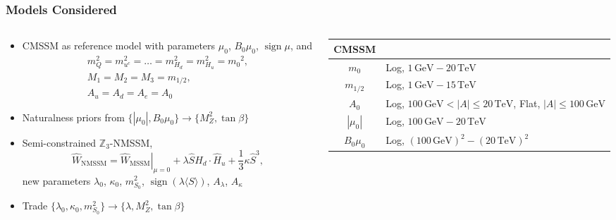 \documentclass[10pt,aspectratio=169]{beamer}
\DeclareMathOperator{\sign}{sign}
\newcommand{\mzero}{\ensuremath{m_0}\xspace}
\newcommand{\mhalf}{\ensuremath{m_{1/2}}\xspace}
\newcommand{\azero}{\ensuremath{A_0}\xspace}
\newcommand{\sgnmu}{\ensuremath{\sign \mu}\xspace}
\newcommand{\gev}{\ensuremath{\,\text{GeV}}\xspace}
\newcommand{\tev}{\ensuremath{\,\text{TeV}}\xspace}
\begin{document}
\begin{frame}
  \frametitle{Models Considered}
  \begin{columns}[t]
    \begin{column}{0.55\textwidth}
      \vspace{-10pt}
      \begin{itemize} \itemsep1em
      \item CMSSM as reference model with parameters
        $\mu_0$, $B_0 \mu_0$, $\sgnmu$, and
        \begin{gather*}
          m_Q^2 = m_{u^c}^2 = \ldots = m_{H_d}^2 = m_{H_u}^2 = \mzero^2 , \\
          M_1 = M_2 = M_3 = \mhalf , \\
          A_u = A_d = A_e = \azero
        \end{gather*}
      \item Naturalness priors from $\{ |\mu_0 |, B_0 \mu_0 \}
        \to \{ M_Z^2, \tan\beta \}$
      \item Semi-constrained $\mathbb{Z}_3$-NMSSM,
        \begin{equation*}
          \widehat{W}_{\text{NMSSM}} = \left . \widehat{W}_{\text{MSSM}}
          \right |_{\mu = 0} + \lambda \hat{S} \hat{H}_d \cdot \hat{H}_u
          + \frac{1}{3} \kappa \hat{S}^3 ,
        \end{equation*}
        new parameters $\lambda_0$, $\kappa_0$, $m_{S_0}^2$,
        $\sign (\lambda \langle S \rangle)$,
        $A_\lambda$, $A_\kappa$
      \item Trade $\{ \lambda_0, \kappa_0, m_{S_0}^2 \}
        \to \{ \lambda, M_Z^2, \tan\beta \}$
      \end{itemize}
    \end{column}
    \begin{column}{0.5\textwidth}
      \begin{table}
        \centering
        \begin{tabularx}{0.8\textwidth}{cX}
          \toprule
          CMSSM\\
          \midrule
          \mzero & Log, $1\gev - 20\tev$\\
          \mhalf & Log, $1\gev - 15\tev$\\
          \azero & \parbox[c]{\textwidth}{Log,
            $100 \gev < |A| \le 20\tev$,\\
            Flat, $|A| \le 100 \gev$}\\
          $|\mu_0|$ & Log, $100\gev-20\tev$\\
          $B_0\mu_0$ & Log, $(100\gev)^2-(20\tev)^2$\\

\end{tabularx}
\end{table}
\end{column}
\end{columns}
\end{frame}
\end{document}
